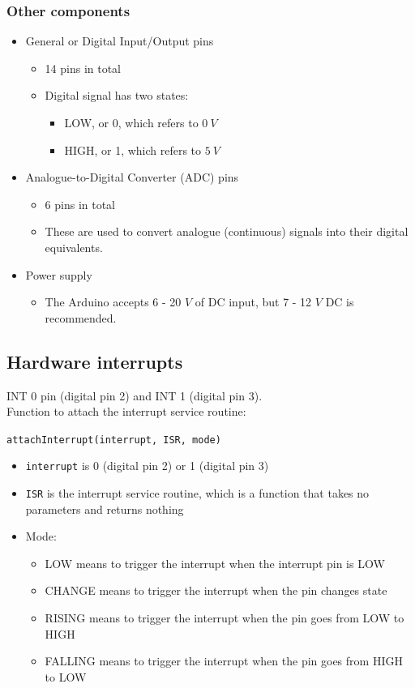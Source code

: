 \documentclass[11pt]{article}
\begin{document}
\subsubsection{Other components}
\label{sec:orgf71655b}
\begin{itemize}
\item General or Digital Input/Output pins
\begin{itemize}
\item 14 pins in total
\item Digital signal has two states:
\begin{itemize}
\item LOW, or 0, which refers to \(\qty{0}{V}\)
\item HIGH, or 1, which refers to \(\qty{5}{V}\)
\end{itemize}
\end{itemize}
\item Analogue-to-Digital Converter (ADC) pins
\begin{itemize}
\item 6 pins in total
\item These are used to convert analogue (continuous) signals into their digital equivalents.
\end{itemize}
\item Power supply
\begin{itemize}
\item The Arduino accepts 6 - 20 \(\unit{V}\) of DC input, but 7 - 12 \(\unit{V}\) DC is recommended.
\end{itemize}
\end{itemize}

 \newpage

\subsection{Hardware interrupts}
\label{sec:orgdb839b3}
INT 0 pin (digital pin 2) and INT 1 (digital pin 3).
\\[0pt]

Function to attach the interrupt service routine:

\texttt{attachInterrupt(interrupt, ISR, mode)}
\begin{itemize}
\item \texttt{interrupt} is 0 (digital pin 2) or 1 (digital pin 3)
\item \texttt{ISR} is the interrupt service routine, which is a function that takes no parameters and returns nothing
\item Mode:
\begin{itemize}
\item LOW means to trigger the interrupt when the interrupt pin is LOW
\item CHANGE means to trigger the interrupt when the pin changes state
\item RISING means to trigger the interrupt when the pin goes from LOW to HIGH
\item FALLING means to trigger the interrupt when the pin goes from HIGH to LOW
\end{itemize}
\end{itemize}
\end{document}
